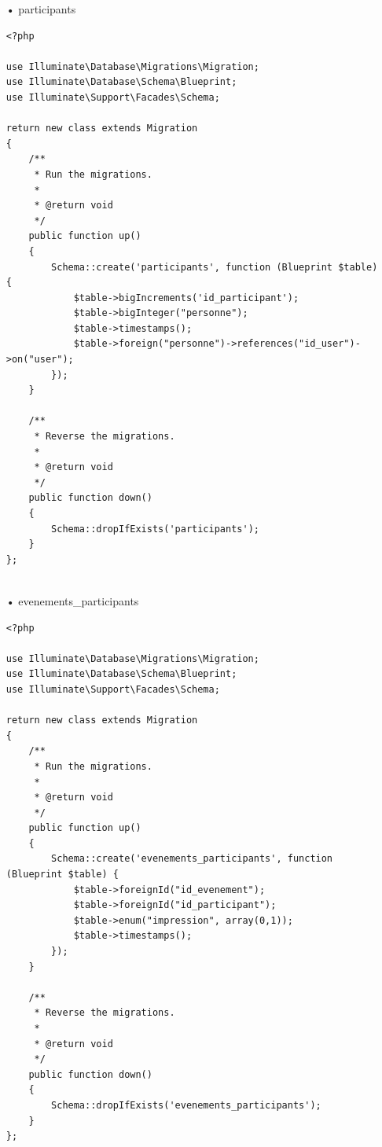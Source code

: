 \documentclass[12pt,a4paper]{article}
\begin{document}
\begin{itemize}
\begin{verbatim}
use Illuminate\Database\Migrations\Migration;
use Illuminate\Database\Schema\Blueprint;
use Illuminate\Support\Facades\Schema;

return new class extends Migration
{
    /**
     * Run the migrations.
     *
     * @return void
     */
    public function up()
    {
        Schema::create('evenements', function (Blueprint $table) {
            $table->bigIncrements("id_evenement");
            $table->string('nom');
            $table->float('montant');
            $table->date('date'); // date et heur
            $table->json('adresse');
            $table->bigInteger('organisateur');
            $table->timestamps();
            $table->foreign("organisateur")->references("id_user")->on("users");
        });
    }

    /**
     * Reverse the migrations.
     *
     * @return void
     */
    public function down()
    {
        Schema::dropIfExists('evenements');
    }
};

\end{verbatim}
\item[•] participants
\begin{verbatim}
<?php

use Illuminate\Database\Migrations\Migration;
use Illuminate\Database\Schema\Blueprint;
use Illuminate\Support\Facades\Schema;

return new class extends Migration
{
    /**
     * Run the migrations.
     *
     * @return void
     */
    public function up()
    {
        Schema::create('participants', function (Blueprint $table) {
            $table->bigIncrements('id_participant');
            $table->bigInteger("personne");
            $table->timestamps();
            $table->foreign("personne")->references("id_user")->on("user");
        });
    }

    /**
     * Reverse the migrations.
     *
     * @return void
     */
    public function down()
    {
        Schema::dropIfExists('participants');
    }
};


\end{verbatim}
\item[•] evenements\_participants
\begin{verbatim}
<?php

use Illuminate\Database\Migrations\Migration;
use Illuminate\Database\Schema\Blueprint;
use Illuminate\Support\Facades\Schema;

return new class extends Migration
{
    /**
     * Run the migrations.
     *
     * @return void
     */
    public function up()
    {
        Schema::create('evenements_participants', function (Blueprint $table) {
            $table->foreignId("id_evenement");
            $table->foreignId("id_participant");
            $table->enum("impression", array(0,1));
            $table->timestamps();
        });
    }

    /**
     * Reverse the migrations.
     *
     * @return void
     */
    public function down()
    {
        Schema::dropIfExists('evenements_participants');
    }
};

\end{verbatim}
\end{itemize}
\end{document}
